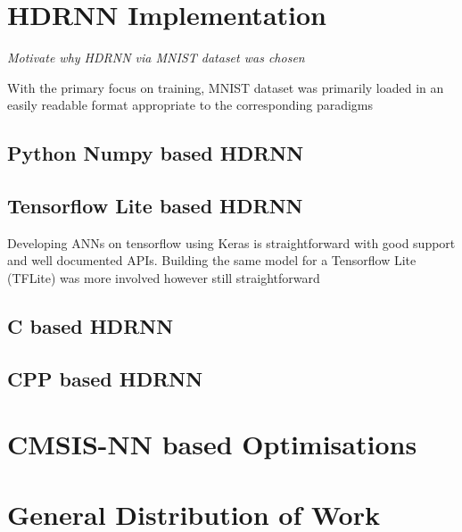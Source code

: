 \section{HDRNN Implementation}
\textit{Motivate why HDRNN via MNIST dataset was chosen}

With the primary focus on training, MNIST dataset was primarily loaded in an easily readable format appropriate to the corresponding paradigms

\subsection[Python - Numpy]{Python Numpy based HDRNN}

\subsection[Tensorflow Lite]{Tensorflow Lite based HDRNN}

Developing ANNs on tensorflow using Keras is straightforward with good support and well documented APIs. Building the same model for a Tensorflow Lite (TFLite) was more involved however still straightforward

\subsection[C]{C based HDRNN}

\subsection[CPP - Eigen]{CPP based HDRNN}

\section{CMSIS-NN based Optimisations}
\textit{}

\section{General Distribution of Work}
